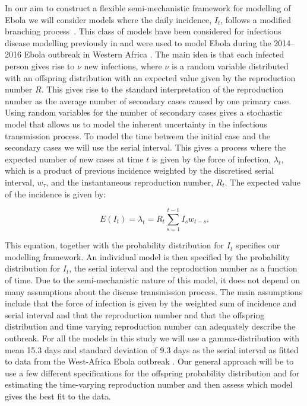\documentclass[12pt]{article}
\begin{document}
In our aim to construct a flexible semi-mechanistic framework for modelling of Ebola we will consider models where the daily incidence, $I_t$, follows a modified branching process~\cite{jacobBranchingProcessesTheir2010}. This class of models have been considered for infectious disease modelling previously in \cite{coriNewFrameworkSoftware2013,lloyd-smithSuperspreadingEffectIndividual2005,nouvelletSimpleApproachMeasure2018} and were used to model Ebola during the 2014--2016 Ebola outbreak in Western Africa \cite{whoebolaresponseteamEbolaVirusDisease2014, internationalebolaresponseteamExposurePatternsDriving2016}. The main idea is that each infected person gives rise to $\nu$ new infections, where $\nu$ is a random variable distributed with an offspring distribution with an expected value given by the reproduction number $R$. This gives rise to the standard interpretation of the reproduction number as the average number of secondary cases caused by one primary case. Using random variables for the number of secondary cases gives a stochastic model that allows us to model the inherent uncertainty in the infectious transmission process. To model the time between the initial case and the secondary cases we will use the serial interval. This gives a process where the expected number of new cases at time $t$ is given by the force of infection, $\lambda_t$, which is a product of previous incidence weighted by the discretised serial interval, $w_\tau$, and the instantaneous reproduction number, $R_t$. The expected value of the incidence is given by:

\begin{equation}
  E(I_t) = \lambda_t =  R_t \sum^{t-1}_{s=1} I_s w_{t-s}.
  \label{eq:mean_It}
\end{equation}

This equation, together with the probability distribution for $I_t$ specifies our modelling framework. An individual model is then specified by the probability distribution for $I_t$, the serial interval and the reproduction number as a function of time. Due to the semi-mechanistic nature of this model, it does not depend on many assumptions about the disease transmission process. The main assumptions include that the force of infection is given by the weighted sum of incidence and serial interval and that the reproduction number and that the offspring distribution and time varying reproduction number can adequately describe the outbreak. For all the models in this study we will use a gamma-distribution with mean 15.3 days and standard deviation of 9.3 days as the serial interval as fitted to data from the West-Africa Ebola outbreak \cite{whoebolaresponseteamEbolaVirusDisease2014}. Our general approach will be to use a few different specifications for the offspring probability distribution and for estimating the time-varying reproduction number and then assess which model gives the best fit to the data.
\end{document}
